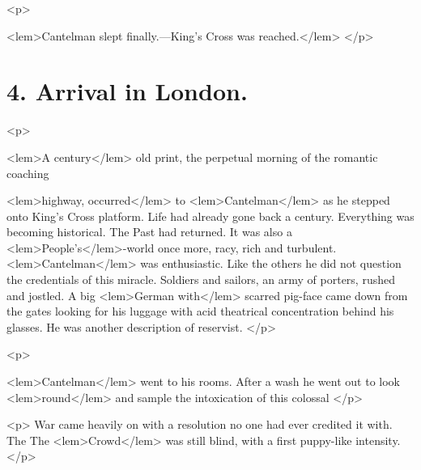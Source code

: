 {{				<p>
					
<lem>Cantelman slept finally.---King's Cross was reached.</lem>{} 
				</p>

\newpage %

	\section*{4. Arrival in London.}

				<p>

<lem>A century</lem>
						{} 
					old print, the perpetual morning of the romantic coaching 
					
<lem>highway, occurred</lem> 
						{} 
					to 
<lem>Cantelman</lem>
						{} 
					as he stepped onto King's Cross 
					platform. Life had already gone back a century. Everything was becoming historical. 
					The Past had returned. It was also a 
<lem>People's</lem>{}-world once more, racy, rich and 
					turbulent. 
<lem>Cantelman</lem>
						{} 
					was enthusiastic. Like the others he did not question the 
					credentials of this miracle. Soldiers and sailors, an army of porters, rushed and 
					jostled. A big 
<lem>German with</lem>
						{} 
					scarred pig-face came down from the gates looking for his 
					luggage with acid theatrical concentration behind his glasses. He was another 
					description of reservist. 
 				</p>

				<p>
					
<lem>Cantelman</lem>
						{} 
					went to his rooms. After a wash he went out to look 
<lem>round</lem>
						{} 
					and sample the 
					intoxication of this colossal 
						{} 
 				</p>

				<p>
					War came heavily on with a resolution no one had ever credited it with. The 
						{}
					The 
<lem>Crowd</lem>{} was still blind, with a first puppy-like 
					intensity. 
 				</p>

}}
